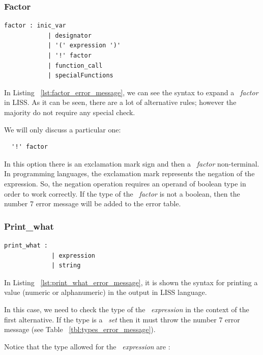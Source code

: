 \documentclass[
  oneside,
  11pt, a4paper,
  footinclude=true,
  headinclude=true,
  cleardoublepage=empty
]{scrbook}
\begin{document}
\subsubsection{Factor}

\begin{lstlisting}[caption={Factor rule in LISS},label={lst:factor_error_message}]
  factor : inic_var
            | designator
            | '(' expression ')'
            | '!' factor
            | function_call
            | specialFunctions
\end{lstlisting}

In Listing ~\ref{lst:factor_error_message}, we can see the syntax to expand a ~\textit{factor} in LISS.
As it can be seen, there are a lot of alternative rules; however the majority do not require any special check.

We will only discuss a particular one:

\begin{lstlisting}
  '!' factor
\end{lstlisting}

In this option there is an exclamation mark sign and then a ~\textit{factor} non-terminal. In programming languages, the exclamation mark represents the negation of the expression. So, the negation operation requires an operand of boolean type in order to work correctly.
If the type of the ~\textit{factor} is not a boolean, then the number 7 error message will be added to the error table.

\subsubsection{Print\_what}

\begin{lstlisting}[caption={Print\_what rule in LISS},label={lst:print_what_error_message}]
  print_what : 
             | expression
             | string
\end{lstlisting}

In Listing ~\ref{lst:print_what_error_message}, it is shown the syntax for printing a value (numeric or alphanumeric) in the output in LISS language.

In this case, we need to check the type of the ~\textit{expression} in the context of the first alternative. If the type is a ~\textit{set} then it must throw the number 7 error message (see Table ~\ref{tbl:types_error_message}).

Notice that the type allowed for the ~\textit{expression} are :
\end{document}
